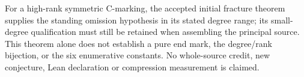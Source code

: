 \documentclass[11pt,a4paper]{article}
\begin{document}
For a high-rank symmetric C-marking, the accepted initial
fracture theorem supplies the standing omission hypothesis
in its stated degree range; its small-degree qualification
must still be retained when assembling the principal source.
This theorem alone does not establish a pure end mark,
the degree/rank bijection, or the six enumerative constants.
No whole-source credit, new conjecture, Lean declaration or
compression measurement is claimed.
\end{document}

